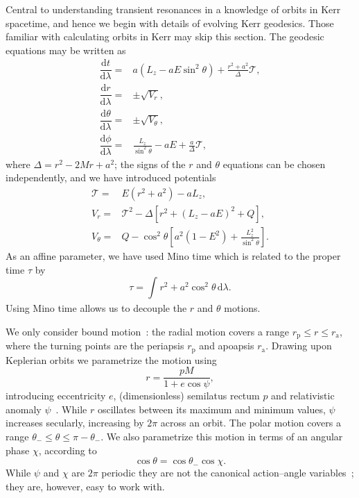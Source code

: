 \documentclass[aps,prd,amsfonts,amssymb,amsmath,nofootinbib,showpacs,superscriptaddress,twocolumn]{revtex4}
\newcommand{\sub}[1]{\ensuremath{_\mathrm{#1}}}
\newcommand{\dd}{\ensuremath{\mathrm{d}}}
\newcommand{\diff}[2]{\ensuremath{\dfrac{\dd {#1}}{\dd {#2}}}}
\newcommand{\intd}[4]{\ensuremath{\int_{#1}^{#2}{#3}\,\dd{#4}}}
\begin{document}
Central to understanding transient resonances in a knowledge of orbits in Kerr spacetime, and hence we begin with details of evolving Kerr geodesics. Those familiar with calculating orbits in Kerr may skip this section. The geodesic equations may be written as~\cite{Carter1968, Chandrasekhar1992} %
\begin{subequations}
\begin{align}
\diff{t}{\lambda} = {} & a\left(L_z - aE\sin^2 \theta\right) + \frac{r^2 + a^2}{\Delta}\mathcal{T},\\
\diff{r}{\lambda} = {} & \pm \sqrt{V_r},\\
\diff{\theta}{\lambda} = {} & \pm \sqrt{V_\theta},\\
\diff{\phi}{\lambda} = {} & \frac{L_z}{\sin^2 \theta} - aE + \frac{a}{\Delta}\mathcal{T},
\end{align}
\end{subequations}
where $\Delta = r^2 - 2M r + a^2$; the signs of the $r$ and $\theta$ equations can be chosen independently, and we have introduced potentials
\begin{subequations}
\begin{align}
\mathcal{T} = {} & E\left(r^2 +a^2\right) - aL_z,\\
V_r = {} & \mathcal{T}^2 - \Delta\left[r^2 + \left(L_z -aE\right)^2 + Q\right],\\
V_\theta = {} & Q - \cos^2 \theta\left[a^2\left(1 - E^2\right) + {\displaystyle \frac{L_z^2}{\sin^2\theta}}\right].
\end{align}
\end{subequations}
As an affine parameter, we have used Mino time which is related to the proper time $\tau$ by~\cite{Mino2003}
\begin{equation}
\tau = \intd{}{}{r^2 + a^2 \cos^2\theta}{\lambda}.
\end{equation}
Using Mino time allows us to decouple the $r$ and $\theta$ motions.

We only consider bound motion~\cite{Wilkins1972}: the radial motion covers a range $r\sub{p} \leq r \leq r\sub{a}$, where the turning points are the periapsis $r\sub{p}$ and apoapsis $r\sub{a}$. Drawing upon Keplerian orbits we parametrize the motion using
\begin{equation}
r = \frac{p M}{1+e\cos\psi},
\end{equation}
introducing eccentricity $e$, (dimensionless) semilatus rectum $p$ and relativistic anomaly $\psi$~\cite{Darwin1961,Drasco2004}. While $r$ oscillates between its maximum and minimum values, $\psi$ increases secularly, increasing by $2\pi$ across an orbit. The polar motion covers a range $\theta_- \leq \theta \leq \pi - \theta_-$. We also parametrize this motion in terms of an angular phase $\chi$, according to~\cite{Hughes2000}
\begin{equation}
\cos\theta = \cos\theta_-\cos\chi.
\end{equation}
While $\psi$ and $\chi$ are $2\pi$ periodic they are not the canonical action--angle variables~\cite{Schmidt2002}; they are, however, easy to work with.
\end{document}
